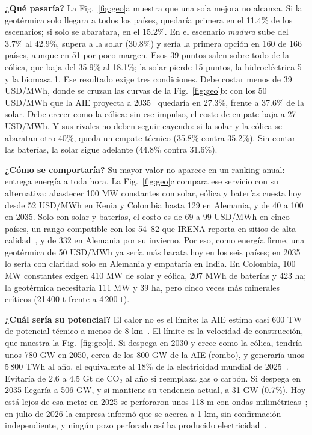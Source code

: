 \documentclass[journal,letterpaper]{IEEEtran}
\begin{document}
\textbf{¿Qué pasaría?} La Fig.~\ref{fig:geo}a muestra que una sola mejora no alcanza. Si la geotérmica solo llegara a todos los países, quedaría primera en el 11.4\% de los escenarios; si solo se abaratara, en el 15.2\%. En el escenario \emph{madura} sube del 3.7\% al 42.9\%, supera a la solar (30.8\%) y sería la primera opción en 160 de 166 países, aunque en 51 por poco margen. Esos 39 puntos salen sobre todo de la eólica, que baja del 35.9\% al 18.1\%; la solar pierde 15 puntos, la hidroeléctrica 5 y la biomasa 1. Ese resultado exige tres condiciones. Debe costar menos de 39 USD/MWh, donde se cruzan las curvas de la Fig.~\ref{fig:geo}b: con los 50 USD/MWh que la AIE proyecta a 2035~\cite{iea2024geo} quedaría en 27.3\%, frente a 37.6\% de la solar. Debe crecer como la eólica: sin ese impulso, el costo de empate baja a 27 USD/MWh. Y sus rivales no deben seguir cayendo: si la solar y la eólica se abaratan otro 40\%, queda un empate técnico (35.8\% contra 35.2\%). Sin contar las baterías, la solar sigue adelante (44.8\% contra 31.6\%).

\textbf{¿Cómo se comportaría?} Su mayor valor no aparece en un ranking anual: entrega energía a toda hora. La Fig.~\ref{fig:geo}c compara ese servicio con su alternativa: abastecer 100 MW constantes con solar, eólica y baterías cuesta hoy desde 52 USD/MWh en Kenia y Colombia hasta 129 en Alemania, y de 40 a 100 en 2035. Solo con solar y baterías, el costo es de 69 a 99 USD/MWh en cinco países, un rango compatible con los 54--82 que IRENA reporta en sitios de alta calidad~\cite{irena2026}, y de 332 en Alemania por su invierno. Por eso, como energía firme, una geotérmica de 50 USD/MWh ya sería más barata hoy en los seis países; en 2035 lo sería con claridad solo en Alemania y empataría en India. En Colombia, 100 MW constantes exigen 410 MW de solar y eólica, 207 MWh de baterías y 423 ha; la geotérmica necesitaría 111 MW y 39 ha, pero cinco veces más minerales críticos (21\,400 t frente a 4\,200 t).

\textbf{¿Cuál sería su potencial?} El calor no es el límite: la AIE estima casi 600 TW de potencial técnico a menos de 8 km~\cite{iea2024geo}. El límite es la velocidad de construcción, que muestra la Fig.~\ref{fig:geo}d. Si despega en 2030 y crece como la eólica, tendría unos 780 GW en 2050, cerca de los 800 GW de la AIE (rombo), y generaría unos 5\,800 TWh al año, el equivalente al 18\% de la electricidad mundial de 2025~\cite{ember2026}. Evitaría de 2.6 a 4.5 Gt de CO$_2$ al año si reemplaza gas o carbón. Si despega en 2035 llegaría a 506 GW, y si mantiene su tendencia actual, a 31 GW (0.7\%). Hoy está lejos de esa meta: en 2025 se perforaron unos 118 m con ondas milimétricas~\cite{quaise2025}; en julio de 2026 la empresa informó que se acerca a 1 km, sin confirmación independiente, y ningún pozo perforado así ha producido electricidad~\cite{geoinsider2026}.
\end{document}
